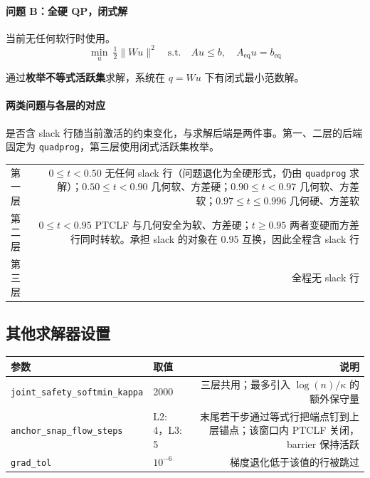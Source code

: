 \documentclass[11pt,a4paper]{ctexart}
\newcommand{\cf}[1]{\texttt{\small #1}}
\begin{document}
\paragraph{问题 B：全硬 QP，闭式解}
当前无任何软行时使用。
\[
\min_{u}\ \tfrac12\lVert W u\rVert^{2}
\quad\text{s.t.}\quad A u\le b,\quad A_{\mathrm{eq}}u=b_{\mathrm{eq}}
\]

\noindent 通过\textbf{枚举不等式活跃集}求解，系统在 $q=Wu$ 下有闭式最小范数解。

\paragraph{两类问题与各层的对应}
是否含 slack 行随当前激活的约束变化，与求解后端是两件事。第一、二层的后端固定为 \cf{quadprog}，第三层使用闭式活跃集枚举。

\begin{center}
\small
\begin{tabularx}{\textwidth}{@{}p{1.6cm}R@{}}
\toprule
第一层 & $0\le t<0.50$ 无任何 slack 行（问题退化为全硬形式，仍由 \cf{quadprog} 求解）；$0.50\le t<0.90$ 几何软、方差硬；$0.90\le t<0.97$ 几何软、方差软；$0.97\le t\le0.996$ 几何硬、方差软 \\
第二层 & $0\le t<0.95$ PTCLF 与几何安全为软、方差硬；$t\ge0.95$ 两者变硬而方差行同时转软。承担 slack 的对象在 0.95 互换，因此全程含 slack 行 \\
第三层 & 全程无 slack 行 \\
\bottomrule
\end{tabularx}
\end{center}

\subsection{其他求解器设置}
\begin{center}
\small
\begin{tabularx}{\textwidth}{@{}p{5.8cm}p{2.2cm}R@{}}
\toprule
\textbf{参数} & \textbf{取值} & \textbf{说明} \\
\midrule
\cf{joint\_safety\_softmin\_kappa} & 2000 & 三层共用；最多引入 $\log(n)/\kappa$ 的额外保守量 \\
\cf{anchor\_snap\_flow\_steps} & L2: 4，L3: 5 & 末尾若干步通过等式行把端点钉到上层锚点；该窗口内 PTCLF 关闭，barrier 保持活跃 \\
\cf{grad\_tol} & $10^{-6}$ & 梯度退化低于该值的行被跳过 \\
\bottomrule
\end{tabularx}
\end{center}
\end{document}
